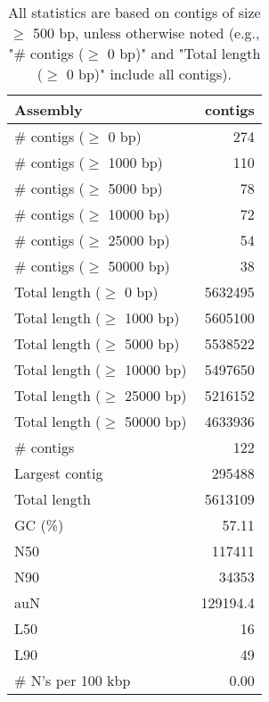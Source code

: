 \documentclass[12pt,a4paper]{article}
\begin{document}
\begin{table}[ht]
\begin{center}
\caption{All statistics are based on contigs of size $\geq$ 500 bp, unless otherwise noted (e.g., "\# contigs ($\geq$ 0 bp)" and "Total length ($\geq$ 0 bp)" include all contigs).}
\begin{tabular}{|l*{1}{|r}|}
\hline
Assembly & contigs \\ \hline
\# contigs ($\geq$ 0 bp) & 274 \\ \hline
\# contigs ($\geq$ 1000 bp) & 110 \\ \hline
\# contigs ($\geq$ 5000 bp) & 78 \\ \hline
\# contigs ($\geq$ 10000 bp) & 72 \\ \hline
\# contigs ($\geq$ 25000 bp) & 54 \\ \hline
\# contigs ($\geq$ 50000 bp) & 38 \\ \hline
Total length ($\geq$ 0 bp) & 5632495 \\ \hline
Total length ($\geq$ 1000 bp) & 5605100 \\ \hline
Total length ($\geq$ 5000 bp) & 5538522 \\ \hline
Total length ($\geq$ 10000 bp) & 5497650 \\ \hline
Total length ($\geq$ 25000 bp) & 5216152 \\ \hline
Total length ($\geq$ 50000 bp) & 4633936 \\ \hline
\# contigs & 122 \\ \hline
Largest contig & 295488 \\ \hline
Total length & 5613109 \\ \hline
GC (\%) & 57.11 \\ \hline
N50 & 117411 \\ \hline
N90 & 34353 \\ \hline
auN & 129194.4 \\ \hline
L50 & 16 \\ \hline
L90 & 49 \\ \hline
\# N's per 100 kbp & 0.00 \\ \hline
\end{tabular}
\end{center}
\end{table}
\end{document}
